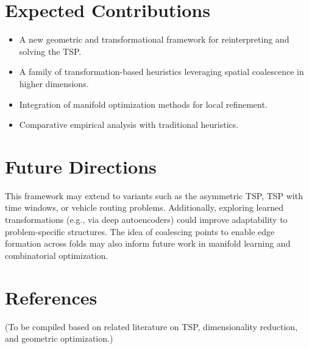 \documentclass{article}
\begin{document}
\section{Expected Contributions}
\begin{itemize}
  \item A new geometric and transformational framework for reinterpreting and solving the TSP.
  \item A family of transformation-based heuristics leveraging spatial coalescence in higher dimensions.
  \item Integration of manifold optimization methods for local refinement.
  \item Comparative empirical analysis with traditional heuristics.
\end{itemize}

\section{Future Directions}
This framework may extend to variants such as the asymmetric TSP, TSP with time windows, or vehicle routing problems. Additionally, exploring learned transformations (e.g., via deep autoencoders) could improve adaptability to problem-specific structures. The idea of coalescing points to enable edge formation across folds may also inform future work in manifold learning and combinatorial optimization.

\section*{References}
(To be compiled based on related literature on TSP, dimensionality reduction, and geometric optimization.)
\end{document}
